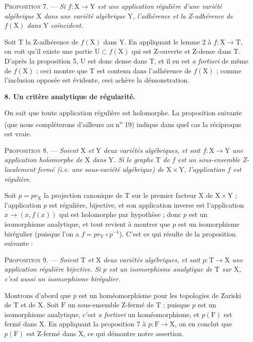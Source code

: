 \textsc{Proposition} 7. — \textit{Si $f : \mathrm{X} \to \mathrm{Y}$ est une application régulière d'une variété algébrique $\mathrm{X}$ dans une variété algébrique $\mathrm{Y}$, l'adhérence et la Z-adhérence de $f(\mathrm{X})$ dans $\mathrm{Y}$ coïncident.}

Soit $\mathrm{T}$ la Z-adhérence de $f(\mathrm{X})$ dans $\mathrm{Y}$. En appliquant le lemme 2 à $f : \mathrm{X} \to \mathrm{T}$, on voit qu'il existe une partie $\mathrm{U} \subset f(\mathrm{X})$ %
qui est Z-ouverte et Z-dense dans $\mathrm{T}$. D'après la proposition 5, $\mathrm{U}$ est donc dense dans $\mathrm{T}$, et il en est \textit{a fortiori} de même de $f(\mathrm{X})$ ; ceci montre que $\mathrm{T}$ est contenu dans l'adhérence de $f(\mathrm{X})$ ; comme l'inclusion opposée est évidente, ceci achève la démonstration.


\textbf{8. Un critère analytique de régularité.}

On sait que toute application régulière est holomorphe. La proposition suivante (que nous compléterons d'ailleurs au n\textsuperscript{o} 19) indique dans quel cas la réciproque est vraie.

\textsc{Proposition} 8. --- \textit{Soient $\mathrm{X}$ et $\mathrm{Y}$ deux variétés algébriques, et soit $f : \mathrm{X} \to \mathrm{Y}$ une application holomorphe de $\mathrm{X}$ dans $\mathrm{Y}$. Si le graphe $\mathrm{T}$ de $f$ est un sous-ensemble Z-localement fermé (i.e. une sous-variété algébrique) de $\mathrm{X} \times \mathrm{Y}$, l'application $f$ est régulière.}

Soit $p = pr_\mathrm{X}$ la projection canonique de $\mathrm{T}$ sur le premier facteur $\mathrm{X}$ de $\mathrm{X} \times \mathrm{Y}$ ; l'application $p$ est régulière, bijective, et son application inverse est l'application $x \to (x, f(x))$ qui est holomorphe par hypothèse ; donc $p$ est un isomorphisme analytique, et tout revient à montrer que $p$ est un isomorphisme birégulier (puisque l'on a $f = pr_\mathrm{Y} \circ p^{-1}$). C'est ce qui résulte de la proposition suivante :

\textsc{Proposition} 9. --- \textit{Soient $\mathrm{T}$ et $\mathrm{X}$ deux variétés algébriques, et soit $p : \mathrm{T} \to \mathrm{X}$ une application régulière bijective. Si $p$ est un isomorphisme analytique de $\mathrm{T}$ sur $\mathrm{X}$, c'est aussi un isomorphisme birégulier.}

Montrons d'abord que $p$ est un homéomorphisme pour les topologies de Zariski de $\mathrm{T}$ et de $\mathrm{X}$. Soit $\mathrm{F}$ un sous-ensemble Z-fermé de $\mathrm{T}$ ; puisque $p$ est un isomorphisme analytique, c'est \textit{a fortiori} un homéomorphisme, et $p(\mathrm{F})$ est fermé dans $\mathrm{X}$. En appliquant la proposition 7 à $p : \mathrm{F} \to \mathrm{X}$, on en conclut que $p(\mathrm{F})$ est Z-fermé dans $\mathrm{X}$, ce qui démontre notre assertion.

